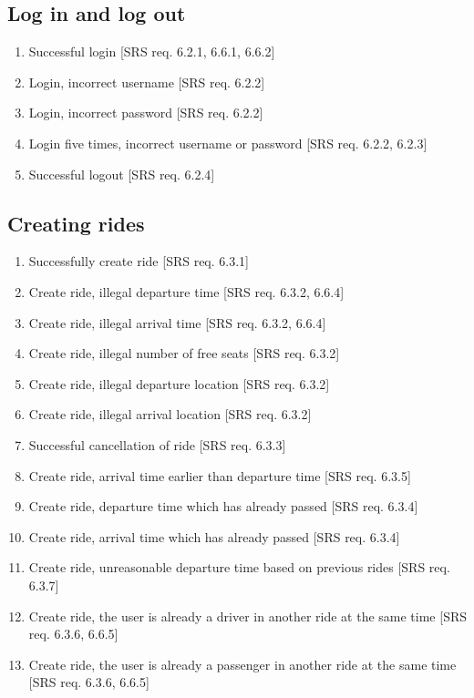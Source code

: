 \documentclass{article}
\begin{document}
\subsection{Log in and log out}

\begin{enumerate}[start=1,label={FT2.\arabic* }, leftmargin = 1.1cm, nolistsep]
\item Successful login [SRS req. 6.2.1, 6.6.1, 6.6.2]
\item Login, incorrect username [SRS req. 6.2.2]
\item Login, incorrect password [SRS req. 6.2.2]
\item Login five times, incorrect username or password [SRS req. 6.2.2, 6.2.3]
\item Successful logout [SRS req. 6.2.4]
\end{enumerate}

\subsection{Creating rides}

\begin{enumerate}[start=1,label={FT3.\arabic* }, leftmargin = 1.1cm, nolistsep]
\item Successfully create ride [SRS req. 6.3.1]
\item Create ride, illegal departure time [SRS req. 6.3.2, 6.6.4]
\item Create ride, illegal arrival time [SRS req. 6.3.2, 6.6.4]
\item Create ride, illegal number
of free seats [SRS req. 6.3.2]
\item Create ride, illegal departure location [SRS req. 6.3.2]
\item Create ride, illegal arrival location [SRS req. 6.3.2]
\item Successful cancellation of ride [SRS req. 6.3.3]
\item Create ride, arrival time earlier than departure time [SRS req. 6.3.5]
\item Create ride, departure time which has already passed [SRS req. 6.3.4]
\item Create ride, arrival time which has already passed [SRS req. 6.3.4]
\item Create ride, unreasonable departure time based on previous rides [SRS req. 6.3.7]
\item Create ride, the user is already a driver in another ride at the same time [SRS req. 6.3.6, 6.6.5]
\item Create ride, the user is already a passenger in another ride at the same time [SRS req. 6.3.6, 6.6.5]
\end{enumerate}
\end{document}
